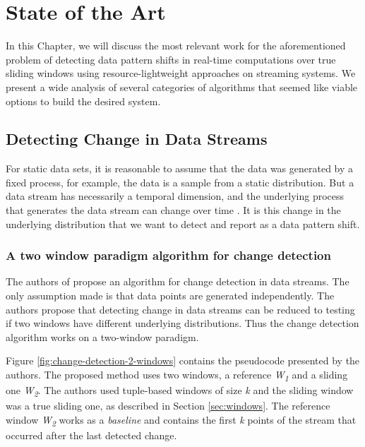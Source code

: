 \chapter{State of the Art} \label{chap:sota} \minitoc

In this Chapter, we will discuss the most relevant work for the aforementioned problem of detecting data pattern shifts in real-time computations over true sliding windows using resource-lightweight approaches on streaming systems. We present a wide analysis of several categories of algorithms that seemed like viable options to build the desired system.

\section{Detecting Change in Data Streams} \label{sec:change-detect}

For static data sets, it is reasonable to assume that the data was generated by a fixed process, for example, the data is a sample from a static distribution. But a data stream has necessarily a temporal dimension, and the underlying process that generates the data stream can change over time \cite{Aggarwal-Evolving-Data-Streams} \cite{Domingos-Mining-Time-Data-Streams}. It is this change in the underlying distribution that we want to detect and report as a data pattern shift.

\subsection{A two window paradigm algorithm for change detection}
\label{subsec:2-window}

The authors of \cite{Kifer-Detecting-Change} propose an algorithm for change detection in data streams. The only assumption made is that data points are generated independently. The authors propose that detecting change in data streams can be reduced to testing if two windows have different underlying distributions. Thus the change detection algorithm works on a two-window paradigm.

Figure \ref{fig:change-detection-2-windows} contains the pseudocode presented by the authors. The proposed method uses two windows, a reference \textit{W\textsubscript{1}} and a sliding one \textit{W\textsubscript{2}}. The authors used tuple-based windows of size \textit{k} and the sliding window was a true sliding one, as described in Section \ref{sec:windows}. The reference window \textit{W\textsubscript{2}} works as a \textit{baseline} and contains the first \textit{k} points of the stream that occurred after the last detected change.

